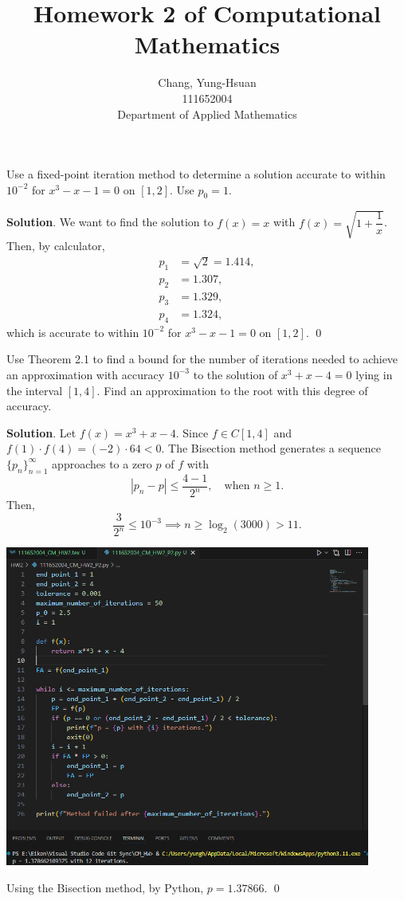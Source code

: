 \documentclass[11pt]{article}
\title{Homework 2 of Computational Mathematics}
\author{Chang, Yung-Hsuan\\111652004\\Department of Applied Mathematics}
\theoremstyle{break}
\numberwithin{equation}{theorem}
\begin{document}
\maketitle
\thispagestyle{empty}
\newpage
{}

\begin{problem}\label{problem 1}
    Use a fixed-point iteration method to determine a solution accurate to within $10^{-2}$ for $x^3-x-1=0$ on $[1, 2]$. Use $p_0=1$.
\end{problem}
\textbf{Solution}. We want to find the solution to $f(x)=x$ with $f(x)=\sqrt{1+\dfrac{1}{x}}$. Then, by calculator,
\begin{align*}
    p_1&=\sqrt{2}=1.414,\\
    p_2&=1.307,\\
    p_3&=1.329,\\
    p_4&=1.324,
\end{align*}
which is accurate to within $10^{-2}$ for $x^3-x-1=0$ on $[1, 2]$. \qed


\newpage
\begin{problem}\label{problem 2}
    Use Theorem 2.1 to find a bound for the number of iterations needed to achieve an approximation with accuracy $10^{-3}$ to the solution of $x^3+x-4=0$ lying in the interval $[1, 4]$. Find an approximation to the root with this degree of accuracy.
\end{problem}
\textbf{Solution}. Let $f(x)=x^3+x-4$. Since $f\in C[1, 4]$ and $f(1)\cdot f(4)=(-2)\cdot 64<0$. The Bisection method generates a sequence $\{p_n\}_{n=1}^\infty$ approaches to a zero $p$ of $f$ with
\begin{equation*}
    |p_n-p|\leq\dfrac{4-1}{2^n},\quad\text{when $n\geq 1$}.
\end{equation*}
Then,
\begin{equation*}
    \dfrac{3}{2^n}\leq10^{-3}\implies n\geq\log_2(3000)>11.
\end{equation*}

\begin{center}
    \includegraphics[width=0.9\textwidth]{problem_2_py.png}
\end{center}
Using the Bisection method, by Python, $p=1.37866$. \qed
\end{document}
